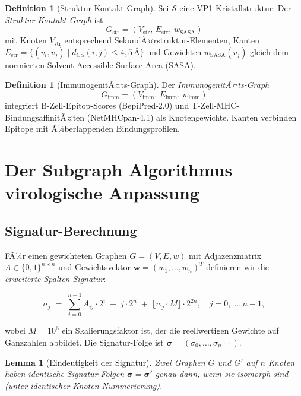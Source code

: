 ﻿\documentclass[a4paper,12pt]{article}
\theoremstyle{plain}
\newtheorem{lemma}[satz]{Lemma}
\theoremstyle{definition}
\newtheorem{definition}[satz]{Definition}
\theoremstyle{remark}
\begin{document}
\begin{definition}[Struktur-Kontakt-Graph]
Sei $\mathcal{S}$ eine VP1-Kristallstruktur. Der \emph{Struktur-Kontakt-Graph} ist
\[
  G_{\text{str}} = (V_{\text{str}},\, E_{\text{str}},\, w_{\text{SASA}})
\]
mit Knoten $V_{\text{str}}$ entsprechend SekundÃ¤rstruktur-Elementen,
Kanten $E_{\text{str}} = \{(v_i,v_j) \mid d_{\text{C}\alpha}(i,j) \leq 4{,}5\,\text{\AA}\}$
und Gewichten $w_{\text{SASA}}(v_j)$ gleich dem normierten Solvent-Accessible Surface Area (SASA).
\end{definition}

\begin{definition}[ImmunogenitÃ¤ts-Graph]
Der \emph{ImmunogenitÃ¤ts-Graph}
\[
  G_{\text{imm}} = (V_{\text{imm}},\, E_{\text{imm}},\, w_{\text{imm}})
\]
integriert B-Zell-Epitop-Scores (BepiPred-2.0) und T-Zell-MHC-BindungsaffinitÃ¤ten
(NetMHCpan-4.1) als Knotengewichte. Kanten verbinden Epitope mit Ã¼berlappenden
Bindungsprofilen.
\end{definition}

\section{Der Subgraph Algorithmus -- virologische Anpassung}

\subsection{Signatur-Berechnung}

FÃ¼r einen gewichteten Graphen $G=(V,E,w)$ mit Adjazenzmatrix $A\in\{0,1\}^{n\times n}$
und Gewichtsvektor $\mathbf{w}=(w_1,\ldots,w_n)^T$ definieren wir die
\emph{erweiterte Spalten-Signatur}:

\begin{equation}\label{eq:sigma}
  \sigma_j \;=\; \sum_{i=0}^{n-1} A_{ij}\cdot 2^i
             \;+\; j\cdot 2^n
             \;+\; \lfloor w_j \cdot M \rfloor \cdot 2^{2n},
             \quad j=0,\ldots,n-1,
\end{equation}

wobei $M=10^6$ ein Skalierungsfaktor ist, der die reellwertigen Gewichte auf
Ganzzahlen abbildet. Die Signatur-Folge ist $\boldsymbol{\sigma}=(\sigma_0,\ldots,\sigma_{n-1})$.

\begin{lemma}[Eindeutigkeit der Signatur]\label{lem:unique}
Zwei Graphen $G$ und $G'$ auf $n$ Knoten haben identische Signatur-Folgen
$\boldsymbol{\sigma}=\boldsymbol{\sigma}'$ genau dann, wenn sie isomorph sind
(unter identischer Knoten-Nummerierung).
\end{lemma}
\end{document}
